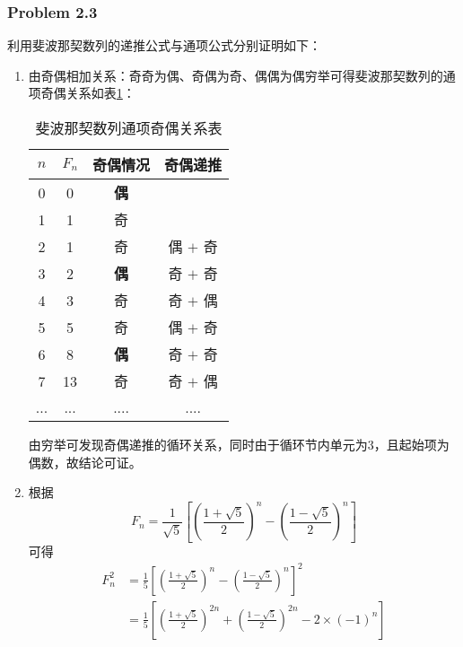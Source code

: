 \documentclass[UTF8,12pt]{article} %
\makeatletter
\theoremstyle{definition}
\newenvironment{proof}[1][\protect\proofname]{\par
\normalfont\topsep6\p@\@plus6\p@\relax
\trivlist
\itemindent\parindent
\item[\hskip\labelsep
\scshape
#1]\ignorespaces
}{%
\endtrivlist\@endpefalse
}
\renewcommand{\proofname}{\it{\textbf{证明}}}
\makeatother
\begin{document}
\subsubsection*{Problem 2.3}
\begin{proof}
利用斐波那契数列的递推公式与通项公式分别证明如下：
\begin{enumerate}[1)]
	\item 由奇偶相加关系：奇奇为偶、奇偶为奇、偶偶为偶穷举可得斐波那契数列的通项奇偶关系如表\ref{tab3}：

\begin{table}[!htbp]
	\caption{斐波那契数列通项奇偶关系表} \centering
	\label{tab3}
	\begin{tabular}{cccc}
	\toprule[1.5pt]
	$n$& $F_{n}$ & 奇偶情况 & 奇偶递推\\
	\midrule[1pt]
	0 & 0 & \textbf{偶}&\\
	1 & 1 & 奇&\\
	2 & 1 & 奇& 偶 $+$ 奇\\
	3 & 2 & \textbf{偶}& 奇 $+$ 奇\\
	4 & 3 & 奇& 奇 $+$ 偶\\
	5 & 5 & 奇& 偶 $+$ 奇\\
	6 & 8 & \textbf{偶}& 奇 $+$ 奇\\
	7 & 13 & 奇& 奇 $+$ 偶\\
	... &...&....&....\\
	\bottomrule[1.5pt]
	\end{tabular}
	\end{table}
	由穷举可发现奇偶递推的循环关系，同时由于循环节内单元为3，且起始项为偶数，故结论可证。
	\item 
	根据\[F_{n}=\frac{1}{\sqrt{5}}\left[\left(\frac{1+\sqrt{5}}{2}\right)^{n}-\left(\frac{1-\sqrt{5}}{2}\right)^{n}\right]\]可得
	\begin{equation}
	\label{eq1}
	\begin{split}
	F_{n}^{2} &= \frac{1}{5}\left[\left(\frac{1+\sqrt{5}}{2}\right)^{n}-\left(\frac{1-\sqrt{5}}{2}\right)^{n}\right]^2\\
	&=\frac{1}{5}\left[\left(\frac{1+\sqrt{5}}{2}\right)^{2n}+\left(\frac{1-\sqrt{5}}{2}\right)^{2n}-2\times (-1)^{n}\right]\\
	\end{split}
	\end{equation}


\end{enumerate}
\end{proof}
\end{document}
